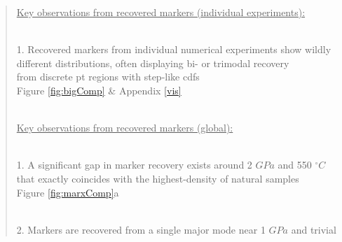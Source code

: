 \begin{quote}
\uline{Key observations from recovered markers (individual experiments):}\\
\strut \\
\hspace*{0.333em}1. Recovered markers from individual numerical experiments show wildly\\
\hspace*{0.333em}\hspace*{0.333em}\hspace*{0.333em}\hspace*{0.333em}different distributions, often displaying bi- or trimodal recovery\\
\hspace*{0.333em}\hspace*{0.333em}\hspace*{0.333em}\hspace*{0.333em}from discrete \gls{pt} regions with step-like \glspl{cdf}\\
\hspace*{0.333em}\hspace*{0.333em}\hspace*{0.333em}\hspace*{0.333em}Figure \ref{fig:bigComp} \& Appendix \ref{vis}\\
\strut \\
\uline{Key observations from recovered markers (global):}\\
\strut \\
\hspace*{0.333em}1. A significant gap in marker recovery exists around 2 \(GPa\) and 550 \(^\circ C\)\\
\hspace*{0.333em}\hspace*{0.333em}\hspace*{0.333em}\hspace*{0.333em}that exactly coincides with the highest-density of natural samples\\
\hspace*{0.333em}\hspace*{0.333em}\hspace*{0.333em}\hspace*{0.333em}Figure \ref{fig:marxComp}a\\
\strut \\
\hspace*{0.333em}2. Markers are recovered from a single major mode near 1 \(GPa\) and trivial\\

\end{quote}
